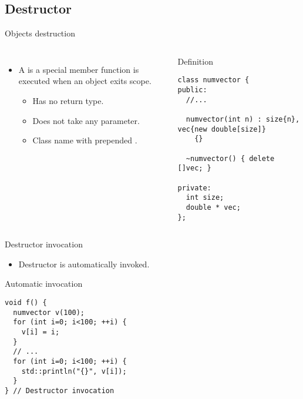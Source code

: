 \subsection{Destructor}

\begin{frame}[t,fragile]{Objects destruction}
\begin{columns}[T]

\begin{itemize}
  \item A  is a special member function is executed
         when an object exits scope.
    \begin{itemize}
      \item Has no return type.
      \item Does not take any parameter.
      \item Class name with prepended \textbf{\cppid{~}}.
    \end{itemize}
\end{itemize}


\begin{block}{Definition}
\begin{lstlisting}
class numvector {
public:
  //...

  numvector(int n) : size{n}, vec{new double[size]}
    {}

  ~numvector() { delete []vec; }

private:
  int size;
  double * vec;
};
\end{lstlisting}
\end{block}

\end{columns}
\end{frame}

\begin{frame}[t,fragile]{Destructor invocation}
\begin{itemize}
  \item Destructor is automatically invoked.
\end{itemize}

\begin{block}{Automatic invocation}
\begin{lstlisting}
void f() {
  numvector v(100);
  for (int i=0; i<100; ++i) {
    v[i] = i;
  }
  // ...
  for (int i=0; i<100; ++i) {
    std::println("{}", v[i]);
  }
} // Destructor invocation
\end{lstlisting}
\end{block}
\end{frame}
